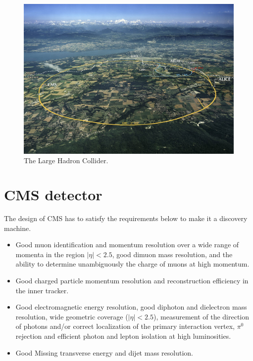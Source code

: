 \begin{figure}
 \begin{center}
  \includegraphics[width=\textwidth]{plot/cern-lhc-aerial.jpg}
 \end{center}
\caption{\label{fig:LHC}The Large Hadron Collider.}
\end{figure}

\section{CMS detector}
The design of CMS has to satisfy the requirements below to make it a discovery machine. 

\begin{itemize}
\item Good muon identification and momentum resolution over a wide range of momenta in the region $|\eta| < 2.5$, good dimuon mass resolution, and the ability to determine unambiguously the charge of muons at high momentum.
\item Good charged particle momentum resolution and reconstruction efficiency in the inner tracker.
\item Good electromagnetic energy resolution, good diphoton and dielectron mass resolution, wide geometric coverage ($|\eta| < 2.5$), measurement of the direction of photons and/or correct localization of the primary interaction vertex, $\pi^{0}$ rejection and efficient photon and lepton isolation at high luminosities.
\item Good Missing transverse energy and dijet mass resolution.
\end{itemize}

